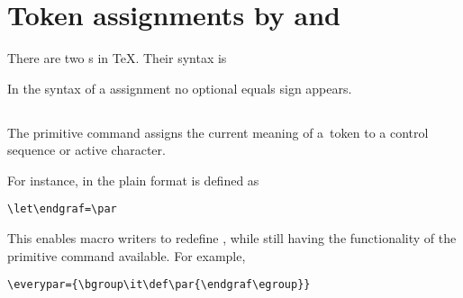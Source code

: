 \documentclass[letterpaper]{book}
\begin{document}
\section{Token assignments by \protect{} and \protect{}}

There are two s in \TeX.
Their syntax is
\begin{disp}%
     \nl
     \end{disp}
In the syntax of a  assignment
no optional equals sign appears.

\subsection{\protect{}}
\label{let}

The primitive command  assigns the current meaning
of a~token to a control sequence or active character.

For instance, in the plain format  is defined
as
\begin{verbatim}
\let\endgraf=\par
\end{verbatim}
This enables macro writers to redefine , while
still having the functionality of the primitive 
command available. For example,
\begin{verbatim}
\everypar={\bgroup\it\def\par{\endgraf\egroup}}
\end{verbatim}
\end{document}
